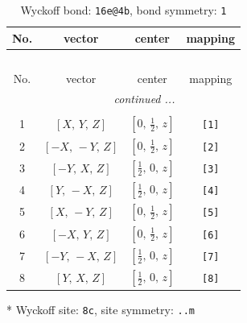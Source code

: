 \documentclass[fleqn,8pt]{jsarticle}
\begin{document}
\begin{longtable}{cccc}
\caption{Wyckoff bond: {\tt 16e@4b}, bond symmetry: {\tt 1}}
 \\
 \hline \hline
No. & vector & center & mapping \\ \hline \endfirsthead

\multicolumn{3}{l}{\tablename\ \thetable{}} \\
 \hline \hline
No. & vector & center & mapping \\ \hline \endhead

 \hline \hline
\multicolumn{3}{r}{\footnotesize\it continued ...} \\ \endfoot

 \hline \hline
\multicolumn{3}{r}{} \\ \endlastfoot

1 & $\left[ X,\, Y,\, Z \right]$ & $\left[ 0,\, \frac{1}{2},\, z \right]$ & {\tt [1]} \\ \hline
2 & $\left[ - X,\, - Y,\, Z \right]$ & $\left[ 0,\, \frac{1}{2},\, z \right]$ & {\tt [2]} \\ \hline
3 & $\left[ - Y,\, X,\, Z \right]$ & $\left[ \frac{1}{2},\, 0,\, z \right]$ & {\tt [3]} \\ \hline
4 & $\left[ Y,\, - X,\, Z \right]$ & $\left[ \frac{1}{2},\, 0,\, z \right]$ & {\tt [4]} \\ \hline
5 & $\left[ X,\, - Y,\, Z \right]$ & $\left[ 0,\, \frac{1}{2},\, z \right]$ & {\tt [5]} \\ \hline
6 & $\left[ - X,\, Y,\, Z \right]$ & $\left[ 0,\, \frac{1}{2},\, z \right]$ & {\tt [6]} \\ \hline
7 & $\left[ - Y,\, - X,\, Z \right]$ & $\left[ \frac{1}{2},\, 0,\, z \right]$ & {\tt [7]} \\ \hline
8 & $\left[ Y,\, X,\, Z \right]$ & $\left[ \frac{1}{2},\, 0,\, z \right]$ & {\tt [8]} \\
\end{longtable}
* Wyckoff site: {\tt 8c}, site symmetry: {\tt ..m}
\renewcommand{\arraystretch}{1.2}
\end{document}
